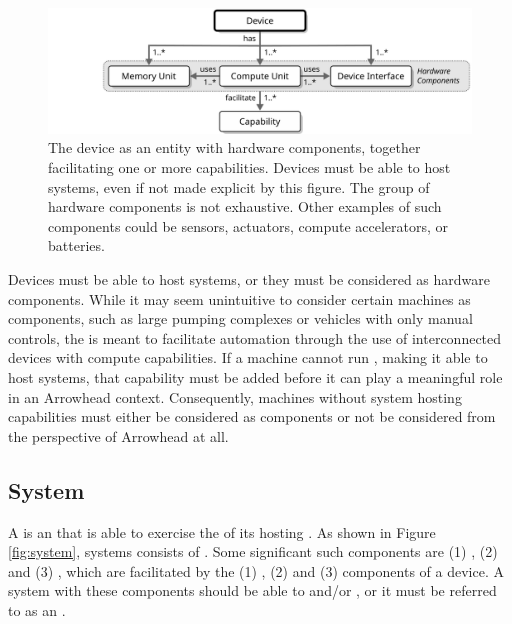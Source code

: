 \begin{figure}[ht!]
  \centering
  \includegraphics[scale=0.9]{figures/device}
  \caption{
    The device as an entity with hardware components, together facilitating one or more capabilities.
    Devices must be able to host systems, even if not made explicit by this figure.
    The group of hardware components is not exhaustive.
    Other examples of such components could be sensors, actuators, compute accelerators, or batteries.
  }
  \label{fig:device}
\end{figure}

\vspace*{1.8mm}

Devices must be able to host systems, or they must be considered as hardware components.
While it may seem unintuitive to consider certain machines as components, such as large pumping complexes or vehicles with only manual controls, the  is meant to facilitate automation through the use of interconnected devices with compute capabilities.
If a machine cannot run , making it able to host systems, that capability must be added before it can play a meaningful role in an Arrowhead context.
Consequently, machines without system hosting capabilities must either be considered as components or not be considered from the perspective of Arrowhead at all.

\subsection{System}
\label{sec:reference-model:system}

A  is an   that is able to exercise the  of its hosting .
As shown in Figure \ref{fig:system}, systems consists of .
Some significant such components are (1) , (2)  and (3) , which are facilitated by the (1) , (2)  and (3)  components of a device.
A system with these components should be able to  and/or  , or it must be referred to as an .

